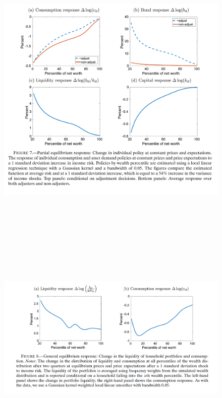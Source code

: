 \documentclass[titlepage]{\econtex}
\begin{document}
\begin{figure}[H]
  \centering
  \includegraphics[width=1\textwidth, height=12cm]{Figure7.png}
  \end{figure}

  \begin{figure}[H]
  \centering
  \includegraphics[width=1\textwidth, height=12cm]{Figure8.png}
  \end{figure}
\end{document}
